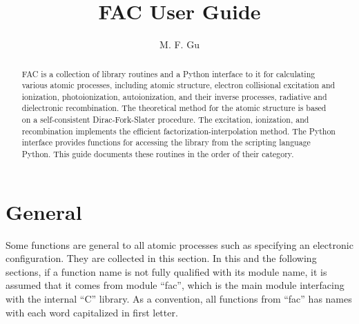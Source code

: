 \documentclass[12pt]{article}
\begin{document}
\title{FAC User Guide}
\author{M. F. Gu}
\maketitle

\begin{abstract}
FAC is a collection of library routines and a Python interface to it for
calculating various atomic processes, including atomic structure, electron
collisional excitation and ionization, photoionization, autoionization, and
their inverse 
processes, radiative and dielectronic recombination. The theoretical method
for the atomic structure is based on a self-consistent Dirac-Fork-Slater
procedure. The excitation, ionization, and recombination implements the
efficient factorization-interpolation method. The Python interface provides
functions for accessing the library from the scripting language Python. This
guide documents these routines in the order of their category.
\end{abstract}

\section{General}
Some functions are general to all atomic processes such as specifying an
electronic configuration. They are collected in this section. In this and the
following sections, if a function name is not fully qualified with its module
name, it is assumed that it comes from module ``fac'', which is the main module
interfacing with the internal ``C'' library. As a convention, all functions
from ``fac'' has names with each word capitalized in first letter.
\end{document}
